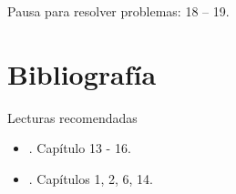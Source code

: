 \documentclass[9pt, aspectratio=169]{beamer}
\begin{document}
\begin{frame}[standout]
	Pausa para resolver problemas: 18 -- 19.
\end{frame}



\section*{Bibliografía}
\begin{frame}{Lecturas recomendadas}
	\begin{itemize}
		\item {}. Capítulo 13 - 16.
		\item {}. Capítulos 1, 2, 6, 14.
	\end{itemize}
\end{frame}
\end{document}
